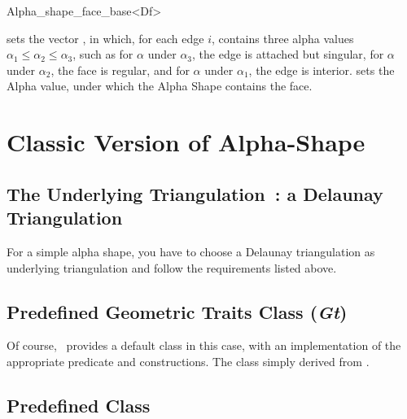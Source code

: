 \begin{ccClass}{Alpha_shape_face_base<Df>}
\ccModifiers

\begin{ccAdvanced}

{sets the vector , in which, for each edge $i$,  contains three
alpha values
 $\alpha_1 \leq \alpha_2 \leq \alpha_3$, such as for
$\alpha$ under $\alpha_3$, the edge is attached but singular,
for $\alpha$ under $\alpha_2$, the face is regular, and for $\alpha$
under $\alpha_1$, the edge is interior.}
{sets the Alpha value, under which the Alpha Shape contains the
face.}

\end{ccAdvanced}

\end{ccClass}


\section{Classic Version of Alpha-Shape\label{I1_SectClassicAS}}

\subsection*{The Underlying Triangulation~: a Delaunay Triangulation}

For a simple alpha shape, you have to choose a Delaunay triangulation as
underlying triangulation  and follow the requirements listed above.


\subsection*{Predefined Geometric Traits Class (\mbox{\it Gt})}

Of course, \cgal\ provides a default  class in this
case, with an implementation of the appropriate predicate and constructions.
The class  simply derived from 
.


\subsection*{Predefined \protect {} Class}

